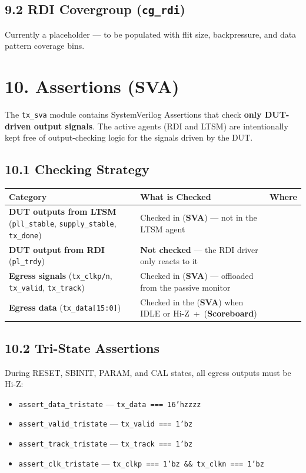 \documentclass[11pt,a4paper]{article}
\begin{document}
\subsection{9.2 RDI Covergroup (\texttt{cg\_rdi})}

Currently a placeholder --- to be populated with flit size, backpressure, and data pattern coverage bins.


\section{10. Assertions (SVA)}

The \texttt{tx\_sva} module contains SystemVerilog Assertions that check \textbf{only DUT-driven output signals}. The active agents (RDI and LTSM) are intentionally kept free of output-checking logic for the signals driven by the DUT.

\subsection{10.1 Checking Strategy}


\begin{tabularx}{\textwidth}{|X|X|X|}
\hline
\textbf{Category} & \textbf{What is Checked} & \textbf{Where} \\
\hline
\textbf{DUT outputs from LTSM} (\texttt{pll\_stable}, \texttt{supply\_stable}, \texttt{tx\_done}) & Checked in (\textbf{SVA})  --- not in the LTSM agent &  \\
\hline
\textbf{DUT output from RDI} (\texttt{pl\_trdy}) & \textbf{Not checked} --- the RDI driver only reacts to it &  \\
\hline
\textbf{Egress signals} (\texttt{tx\_clkp/n}, \texttt{tx\_valid}, \texttt{tx\_track}) & Checked in (\textbf{SVA}) --- offloaded from the passive monitor &  \\
\hline
\textbf{Egress data} (\texttt{tx\_data[15:0]}) & Checked in the (\textbf{SVA}) when IDLE or Hi-Z + (\textbf{Scoreboard}) &  \\
\hline
\end{tabularx}


\subsection{10.2 Tri-State Assertions}

During RESET, SBINIT, PARAM, and CAL states, all egress outputs must be Hi-Z:

\begin{itemize}
  \item \texttt{assert\_data\_tristate} --- \texttt{tx\_data === 16'hzzzz}
  \item \texttt{assert\_valid\_tristate} --- \texttt{tx\_valid === 1'bz}
  \item \texttt{assert\_track\_tristate} --- \texttt{tx\_track === 1'bz}
  \item \texttt{assert\_clk\_tristate} --- \texttt{tx\_clkp === 1'bz \&\& tx\_clkn === 1'bz}
\end{itemize}
\end{document}
